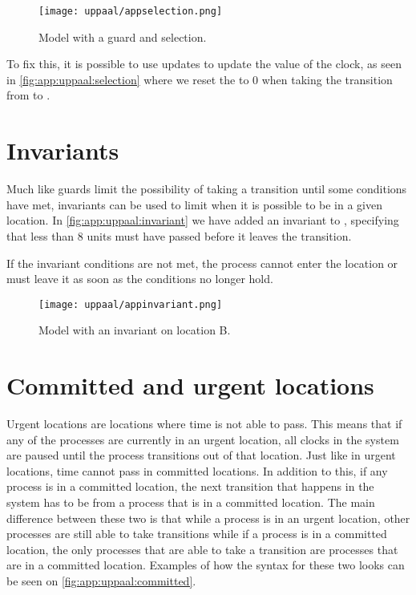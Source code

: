 \begin{figure}[H]
    \centering
    \texttt{[image: uppaal/appselection.png]}
    \caption{Model with a guard and selection.}
    \label{fig:app:uppaal:selection}
\end{figure}
\noindent
To fix this, it is possible to use updates to update the value of the clock, as seen in \autoref{fig:app:uppaal:selection} where we reset the  to 0 when taking the transition from  to .

\section*{Invariants}
Much like guards limit the possibility of taking a transition until some conditions have met, invariants can be used to limit when it is possible to be in a given location.
In \autoref{fig:app:uppaal:invariant} we have added an invariant to , specifying that less than 8  units must have passed before it leaves the transition.

If the invariant conditions are not met, the process cannot enter the location or must leave it as soon as the conditions no longer hold.
\begin{figure}[H]
    \centering
    \texttt{[image: uppaal/appinvariant.png]}
    \caption{Model with an invariant on location B.}
    \label{fig:app:uppaal:invariant}
\end{figure}

\section*{Committed and urgent locations}
Urgent locations are locations where time is not able to pass.
This means that if any of the processes are currently in an urgent location, all clocks in the system are paused until the process transitions out of that location.
Just like in urgent locations, time cannot pass in committed locations.
In addition to this, if any process is in a committed location, the next transition that happens in the system has to be from a process that is in a committed location. 
The main difference between these two is that while a process is in an urgent location, other processes are still able to take transitions while if a process is in a committed location, the only processes that are able to take a transition are processes that are in a committed location.
Examples of how the syntax for these two looks can be seen on \autoref{fig:app:uppaal:committed}.

